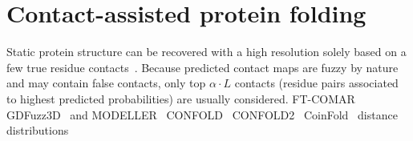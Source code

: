 \section{Contact-assisted protein folding} \label{contactfold}

Static protein structure can be recovered with a high resolution solely based on a few
true residue contacts~\cite{kim2014one}. Because predicted contact maps
are fuzzy by nature and may contain false contacts, only top $\alpha \cdot L$
contacts (residue pairs associated to highest predicted probabilities)
are usually considered.
FT-COMAR~\cite{vassura2008ft}
GDFuzz3D~\cite{pietal2015gdfuzz3d} and MODELLER~\cite{modeller}
CONFOLD~\cite{adhikari2015confold}
CONFOLD2~\cite{adhikari2018confold2}
CoinFold~\cite{wang2016coinfold}
distance distributions~\cite{reese1996distance}

